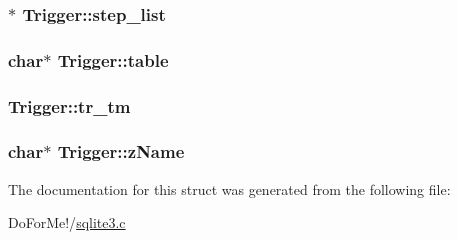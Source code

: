 \hypertarget{struct_trigger_a4206faaae6cdf1a2b22a2c9f15c88642}{
\subsubsection[{step\-\_\-list}]{$\ast$ Trigger\-::step\-\_\-list}}\label{struct_trigger_a4206faaae6cdf1a2b22a2c9f15c88642}
\hypertarget{struct_trigger_ab9d5500f7fc43382e867733a2968ecae}{
\subsubsection[{table}]{\setlength{\rightskip}{0pt plus 5cm}char$\ast$ Trigger\-::table}}\label{struct_trigger_ab9d5500f7fc43382e867733a2968ecae}
\hypertarget{struct_trigger_af0d10da140b068bfd76aaeb6607fa6cf}{
\subsubsection[{tr\-\_\-tm}]{ Trigger\-::tr\-\_\-tm}}\label{struct_trigger_af0d10da140b068bfd76aaeb6607fa6cf}
\hypertarget{struct_trigger_a9aecea5dadd7ae93b7f585c4b914791c}{
\subsubsection[{z\-Name}]{\setlength{\rightskip}{0pt plus 5cm}char$\ast$ Trigger\-::z\-Name}}\label{struct_trigger_a9aecea5dadd7ae93b7f585c4b914791c}


The documentation for this struct was generated from the following file\-:\begin{DoxyCompactItemize}
\item 
Do\-For\-Me!/\hyperlink{sqlite3_8c}{sqlite3.\-c}\end{DoxyCompactItemize}
